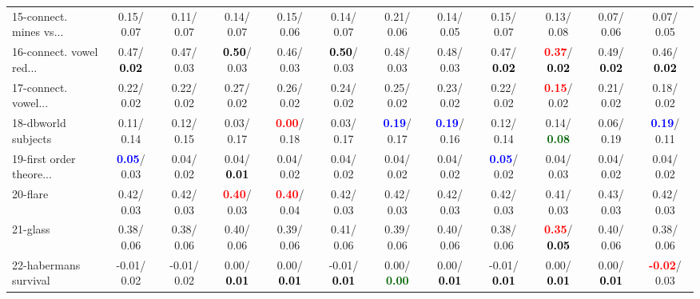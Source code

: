 \begin{table}[h]
\begin{center}
{\begin{tabular}{lc|c|c|c|c|c|c|c|c|c|c}
15-connect. mines vs... &   0.15/  0.07 &   0.11/  0.07 &   0.14/  0.07 &   0.15/  0.06 &   0.14/  0.07 &   0.21/  0.06 &   0.14/  0.05 &   0.15/  0.07 &   0.13/  0.08 &   0.07/  0.06 &   0.07/  0.05 \\
16-connect. vowel red... &   0.47/\textcolor{black}{\textbf{  0.02}} &   0.47/  0.03 & \textcolor{black}{\textbf{  0.50}}/  0.03 &   0.46/  0.03 & \textcolor{black}{\textbf{  0.50}}/  0.03 &   0.48/  0.03 &   0.48/  0.03 &   0.47/\textcolor{black}{\textbf{  0.02}} & \textcolor{red}{\textbf{  0.37}}/\textcolor{black}{\textbf{  0.02}} &   0.49/\textcolor{black}{\textbf{  0.02}} &   0.46/\textcolor{black}{\textbf{  0.02}} \\
17-connect. vowel... &   0.22/  0.02 &   0.22/  0.02 &   0.27/  0.02 &   0.26/  0.02 &   0.24/  0.02 &   0.25/  0.02 &   0.23/  0.02 &   0.22/  0.02 & \textcolor{red}{\textbf{  0.15}}/  0.02 &   0.21/  0.02 &   0.18/  0.02 \\
18-dbworld subjects &   0.11/  0.14 &   0.12/  0.15 &   0.03/  0.17 & \textcolor{red}{\textbf{  0.00}}/  0.18 &   0.03/  0.17 & \textcolor{blue}{\textbf{  0.19}}/  0.17 & \textcolor{blue}{\textbf{  0.19}}/  0.16 &   0.12/  0.14 &   0.14/\textcolor{darkgreen}{\textbf{  0.08}} &   0.06/  0.19 & \textcolor{blue}{\textbf{  0.19}}/  0.11 \\
19-first order theore... & \textcolor{blue}{\textbf{  0.05}}/  0.03 &   0.04/  0.02 &   0.04/\textcolor{black}{\textbf{  0.01}} &   0.04/  0.02 &   0.04/  0.02 &   0.04/  0.02 &   0.04/  0.02 & \textcolor{blue}{\textbf{  0.05}}/  0.02 &   0.04/  0.03 &   0.04/  0.02 &   0.04/  0.02 \\
20-flare &   0.42/  0.03 &   0.42/  0.03 & \textcolor{red}{\textbf{  0.40}}/  0.03 & \textcolor{red}{\textbf{  0.40}}/  0.04 &   0.42/  0.03 &   0.42/  0.03 &   0.42/  0.03 &   0.42/  0.03 &   0.41/  0.03 &   0.43/  0.03 &   0.42/  0.03 \\
21-glass &   0.38/  0.06 &   0.38/  0.06 &   0.40/  0.06 &   0.39/  0.06 &   0.41/  0.06 &   0.39/  0.06 &   0.40/  0.06 &   0.38/  0.06 & \textcolor{red}{\textbf{  0.35}}/\textcolor{black}{\textbf{  0.05}} &   0.40/  0.06 &   0.38/  0.06 \\ \hline
22-habermans survival &  -0.01/  0.02 &  -0.01/  0.02 &   0.00/\textcolor{black}{\textbf{  0.01}} &   0.00/\textcolor{black}{\textbf{  0.01}} &  -0.01/\textcolor{black}{\textbf{  0.01}} &   0.00/\textcolor{darkgreen}{\textbf{  0.00}} &   0.00/\textcolor{black}{\textbf{  0.01}} &  -0.01/\textcolor{black}{\textbf{  0.01}} &   0.00/\textcolor{black}{\textbf{  0.01}} &   0.00/\textcolor{black}{\textbf{  0.01}} & \textcolor{red}{\textbf{ -0.02}}/  0.03 \\

\end{tabular}}
\end{center}
\end{table}
